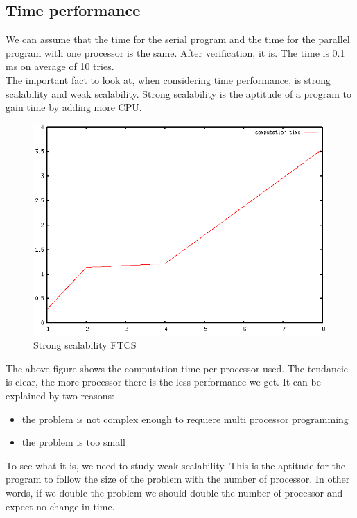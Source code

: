 \documentclass[12pt, a4paper]{report}
\begin{document}
\subsection{Time performance}
We can assume that the time for the serial program and the time for the parallel program with one processor is the same. After verification, it is. The time is 0.1 ms on average of 10 tries.\\
The important fact to look at, when considering time performance, is strong scalability and weak scalability. Strong scalability is the aptitude of a program to gain time by adding more CPU.\\
\begin{figure}[H]
\includegraphics[scale=0.5]{report/strongFTCS}
\caption{Strong scalability FTCS}
\end{figure}
The above figure shows the computation time per processor used. The tendancie is clear, the more processor there is the less performance we get. It can be explained by two reasons:
\begin{itemize}
\item the problem is not complex enough to requiere multi processor programming
\item the problem is too small
\end{itemize} 
To see what it is, we need to study weak scalability. This is the aptitude for the program to follow the size of the problem with the number of processor. In other words, if we double the problem we should double the number of processor and expect no change in time.
\end{document}
